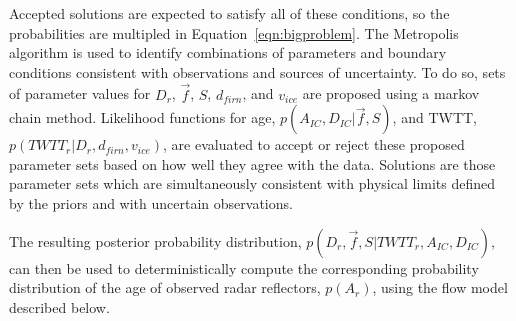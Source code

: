 Accepted solutions are expected to satisfy all of these conditions, so the probabilities are multipled in Equation~\ref{eqn:bigproblem}. The Metropolis algorithm is used to identify combinations of parameters and boundary conditions consistent with observations and sources of uncertainty. To do so, sets of parameter values for $D_r$, $\vec{f}$, $S$, $d_{firn}$, and $v_{ice}$ are proposed using a markov chain method. %
Likelihood functions for age, $p(A_{IC},D_{IC} | \vec{f},S)$, and TWTT, $p(TWTT_r | D_r,d_{firn},v_{ice})$, are evaluated to accept or reject these proposed parameter sets based on how well they agree with the data. Solutions are those parameter sets which are simultaneously consistent with physical limits defined by the priors and with uncertain observations. 

The resulting posterior probability distribution, $p(D_r, \vec{f},S | TWTT_r, A_{IC}, D_{IC})$, can then be used to deterministically compute the corresponding probability distribution of the age of observed radar reflectors, $p(A_r)$, using the flow model described below.



\label{radardepth}

%



